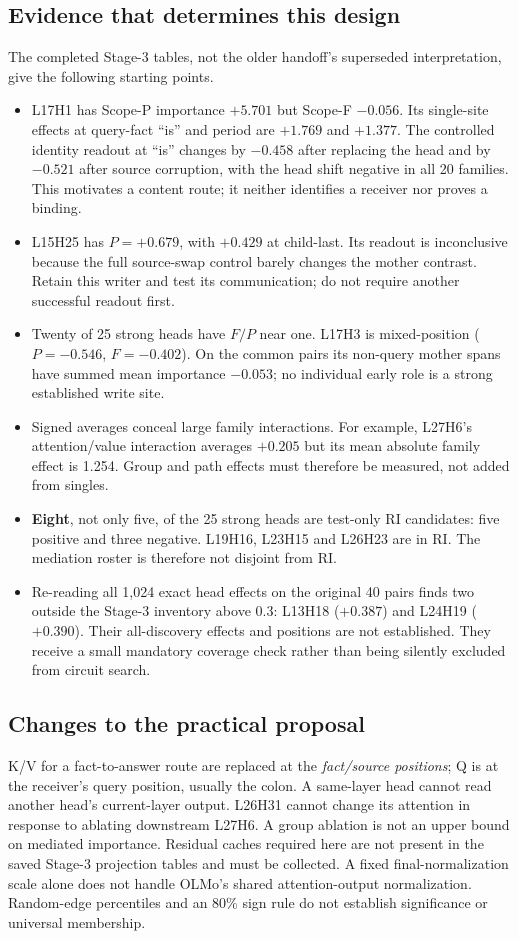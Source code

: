 \documentclass[11pt,a4paper]{article}
\begin{document}
\subsection{Evidence that determines this design}
The completed Stage-3 tables, not the older handoff's superseded interpretation,
give the following starting points.
\begin{itemize}
\item L17H1 has Scope-P importance $+5.701$ but Scope-F $-0.056$. Its single-site
effects at query-fact ``is'' and period are $+1.769$ and $+1.377$. The controlled
identity readout at ``is'' changes by $-0.458$ after replacing the head and by
$-0.521$ after source corruption, with the head shift negative in all 20 families.
This motivates a content route; it neither identifies a receiver nor proves a binding.
\item L15H25 has $P=+0.679$, with $+0.429$ at child-last. Its readout is inconclusive
because the full source-swap control barely changes the mother contrast. Retain this
writer and test its communication; do not require another successful readout first.
\item Twenty of 25 strong heads have $F/P$ near one. L17H3 is mixed-position
($P=-0.546$, $F=-0.402$). On the common pairs its non-query mother spans have summed
mean importance $-0.053$; no individual early role is a strong established write site.
\item Signed averages conceal large family interactions. For example, L27H6's
attention/value interaction averages $+0.205$ but its mean absolute family effect is
1.254. Group and path effects must therefore be measured, not added from singles.
\item \textbf{Eight}, not only five, of the 25 strong heads are test-only RI
candidates: five positive and three negative. L19H16, L23H15 and L26H23 are in RI.
The mediation roster is therefore not disjoint from RI.
\item Re-reading all 1,024 exact head effects on the original 40 pairs finds two
outside the Stage-3 inventory above $0.3$: L13H18 ($+0.387$) and L24H19 ($+0.390$).
Their all-discovery effects and positions are not established. They receive a small
mandatory coverage check rather than being silently excluded from circuit search.
\end{itemize}

\subsection{Changes to the practical proposal}
K/V for a fact-to-answer route are replaced at the \emph{fact/source positions};
Q is at the receiver's query position, usually the colon. A same-layer head cannot
read another head's current-layer output. L26H31 cannot change its attention in
response to ablating downstream L27H6. A group ablation is not an upper bound on
mediated importance. Residual caches required here are not present in the saved
Stage-3 projection tables and must be collected. A fixed final-normalization scale
alone does not handle OLMo's shared attention-output normalization. Random-edge
percentiles and an 80\% sign rule do not establish significance or universal membership.
\end{document}
